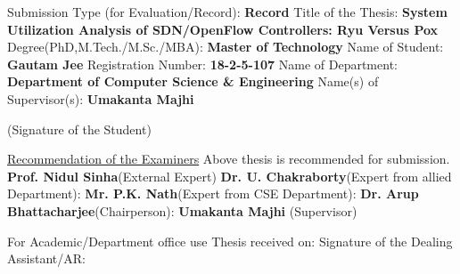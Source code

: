 Submission Type (for Evaluation/Record): \textbf{Record} \linebreak
Title of the Thesis: \textbf{System Utilization Analysis of SDN/OpenFlow Controllers: Ryu Versus Pox}
\vspace{0.25in} \linebreak
Degree(PhD,M.Tech./M.Sc./MBA): \textbf{Master of Technology} \linebreak
Name of Student: \textbf{Gautam Jee} \linebreak
Registration Number: \textbf{18-2-5-107} \linebreak
Name of Department: \textbf{Department of Computer Science & Engineering} \linebreak
Name(s) of Supervisor(s): \textbf{Umakanta Majhi} \linebreak
\begin{flushright}
(Signature of the Student)
\end{flushright}
\vspace{0.5cm}
\underline{Recommendation of the Examiners} \linebreak
Above thesis is recommended for submission.
\textbf{Prof. Nidul Sinha}(External Expert)
\textbf{Dr. U. Chakraborty}(Expert from allied Department):
\textbf{Mr. P.K. Nath}(Expert from CSE Department):
\textbf{Dr. Arup Bhattacharjee}(Chairperson):
\textbf{Umakanta Majhi} (Supervisor)
\begin{minipage}{0.5\textwidth}
\begin{flushleft}
For Academic/Department office use \linebreak
Thesis received on:
Signature of the Dealing Assistant/AR:
\end{flushleft}
\end{minipage}
\begin{minipage}{0.4\textwidth}
\vspace*{\fill}
\end{minipage}
\pagebreak